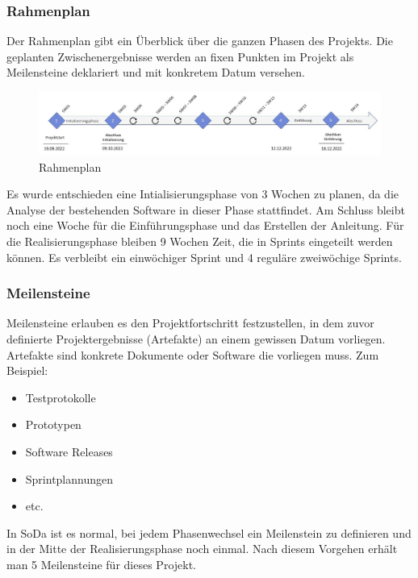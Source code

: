 \documentclass[a4paper, table]{article}
\begin{document}
\subsubsection{Rahmenplan}
Der Rahmenplan gibt ein Überblick über die ganzen Phasen des Projekts.
Die geplanten Zwischenergebnisse werden an fixen Punkten im Projekt als Meilensteine deklariert und mit konkretem Datum versehen.

\begin{figure}[h]
    \centering
    \hspace*{-2cm}
    \includegraphics[width=1.3\textwidth]{img/Rahmenplan.jpg}
    \caption{Rahmenplan}
    \label{fig:Rahmenplan}
\end{figure}
Es wurde entschieden eine Intialisierungsphase von 3 Wochen zu planen, da die Analyse der bestehenden Software in dieser Phase stattfindet.
Am Schluss bleibt noch eine Woche für die Einführungsphase und das Erstellen der Anleitung.
Für die Realisierungsphase bleiben 9 Wochen Zeit, die in Sprints eingeteilt werden können.
Es verbleibt ein einwöchiger Sprint und 4 reguläre zweiwöchige Sprints.

\subsubsection*{Meilensteine}
Meilensteine erlauben es den Projektfortschritt festzustellen,
in dem zuvor definierte Projektergebnisse (Artefakte) an einem gewissen Datum vorliegen.\\
Artefakte sind konkrete Dokumente oder Software die vorliegen muss. Zum Beispiel:
\begin{itemize}
    \item Testprotokolle
    \item Prototypen
    \item Software Releases
    \item Sprintplannungen
    \item etc.
\end{itemize}

In SoDa ist es normal, bei jedem Phasenwechsel ein Meilenstein zu definieren und in der Mitte der
Realisierungsphase noch einmal. \autocite{jenny_projektmanagement_2016} %
Nach diesem Vorgehen erhält man 5 Meilensteine für dieses Projekt.
\end{document}
